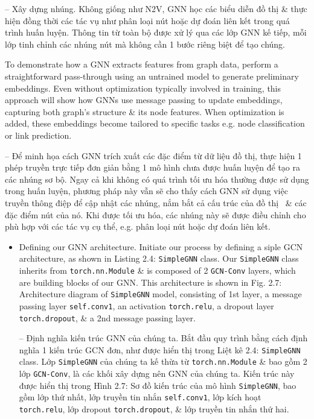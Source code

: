 \documentclass{article}
\begin{document}
\begin{itemize}
\begin{itemize}
\begin{itemize}
           -- {\sf Xây dựng nhúng.} Không giống như N2V, GNN học các biểu diễn đồ thị \& thực hiện đồng thời các tác vụ như phân loại nút hoặc dự đoán liên kết trong quá trình huấn luyện. Thông tin từ toàn bộ được xử lý qua các lớp GNN kế tiếp, mỗi lớp tinh chỉnh các nhúng nút mà không cần 1 bước riêng biệt để tạo chúng.

           To demonstrate how a GNN extracts features from graph data, perform a straightforward pass-through using an untrained model to generate preliminary embeddings. Even without optimization typically involved in training, this approach will show how GNNs use message passing to update embeddings, capturing both graph's structure \& its node features. When optimization is added, these embeddings become tailored to specific tasks e.g. node classification or link prediction.

           -- Để minh họa cách GNN trích xuất các đặc điểm từ dữ liệu đồ thị, thực hiện 1 phép truyền trực tiếp đơn giản bằng 1 mô hình chưa được huấn luyện để tạo ra các nhúng sơ bộ. Ngay cả khi không có quá trình tối ưu hóa thường được sử dụng trong huấn luyện, phương pháp này vẫn sẽ cho thấy cách GNN sử dụng việc truyền thông điệp để cập nhật các nhúng, nắm bắt cả cấu trúc của đồ thị \ \& các đặc điểm nút của nó. Khi được tối ưu hóa, các nhúng này sẽ được điều chỉnh cho phù hợp với các tác vụ cụ thể, e.g. phân loại nút hoặc dự đoán liên kết.
           \begin{itemize}
               \item {\sf Defining our GNN architecture.} Initiate our process by defining a siple GCN architecture, as shown in {\sf Listing 2.4: {\tt SimpleGNN} class}. Our {\tt SimpleGNN} class inherits from {\tt torch.nn.Module} \& is composed of 2 {\tt GCN-Conv} layers, which are building blocks of our GNN. This architecture is shown in {\sf Fig. 2.7: Architecture diagram of {\tt SimpleGNN} model}, consisting of 1st layer, a message passing layer {\tt self.conv1}, an activation {\tt torch.relu}, a dropout layer {\tt torch.dropout}, \& a 2nd message passing layer.

               -- {\sf Định nghĩa kiến trúc GNN của chúng ta.} Bắt đầu quy trình bằng cách định nghĩa 1 kiến trúc GCN đơn, như được hiển thị trong {\sf Liệt kê 2.4: {\tt SimpleGNN} class}. Lớp {\tt SimpleGNN} của chúng ta kế thừa từ {\tt torch.nn.Module} \& bao gồm 2 lớp {\tt GCN-Conv}, là các khối xây dựng nên GNN của chúng ta. Kiến trúc này được hiển thị trong {\sf Hình 2.7: Sơ đồ kiến trúc của mô hình {\tt SimpleGNN}}, bao gồm lớp thứ nhất, lớp truyền tin nhắn {\tt self.conv1}, lớp kích hoạt {\tt torch.relu}, lớp dropout {\tt torch.dropout}, \& lớp truyền tin nhắn thứ hai.


\end{itemize}
\end{itemize}
\end{itemize}
\end{itemize}
\end{document}
